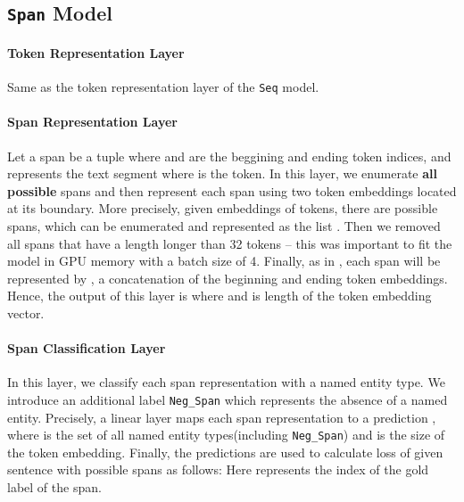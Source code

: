 \documentclass[11pt]{article}
\begin{document}
\subsection{\texttt{Span} Model}

























\paragraph{Token Representation Layer} Same as the token representation layer of the \texttt{Seq} model.

\paragraph{Span Representation Layer} 
Let a span  be a tuple  where  and  are the
beggining and ending token indices, and  represents the text segment
 where  is the  token.
In this layer, we enumerate \textbf{all possible} spans and then represent 
each span using two token embeddings located at its boundary. 
More precisely, given embeddings   of  tokens, there are 
possible spans, which can be enumerated and represented as the list
. Then we removed all spans that have a length longer than 32 tokens -- this was important to fit the model in GPU memory with a batch size of 4. Finally, as in \cite{lee-etal-2017-end}, each span  will be represented by
, a concatenation of the
beginning and ending token embeddings. Hence, the output of this layer is
 where 
and  is length of the token embedding vector.



\paragraph{Span Classification Layer} In this layer, we classify each span
representation with a named entity type. We introduce an additional label
\verb|Neg_Span| which represents the absence of a named entity. Precisely, a
linear layer maps each span representation  to a prediction , where
 is the set of all named entity types(including \verb|Neg_Span|) and
 is the size of the token embedding. Finally, the predictions are used to
calculate loss of given sentence  with  possible spans as follows:
 Here  represents the index of the gold label of the
 span.
\end{document}
